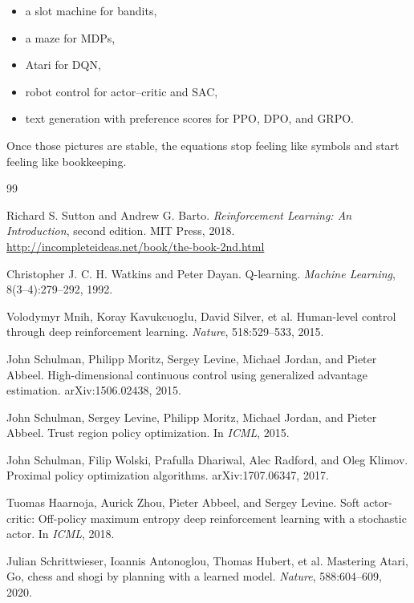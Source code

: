 \documentclass[11pt]{article}
\begin{document}
  \begin{itemize}
    \item a slot machine for bandits,
    \item a maze for MDPs,
    \item Atari for DQN,
    \item robot control for actor--critic and SAC,
    \item text generation with preference scores for PPO, DPO, and GRPO.
  \end{itemize}

  Once those pictures are stable, the equations stop feeling like symbols and start feeling like bookkeeping.

  \begin{thebibliography}{99}

  Richard S. Sutton and Andrew G. Barto.
  \newblock \emph{Reinforcement Learning: An Introduction}, second edition.
  \newblock MIT Press, 2018.
  \newblock \url{http://incompleteideas.net/book/the-book-2nd.html}

  Christopher J. C. H. Watkins and Peter Dayan.
  \newblock Q-learning.
  \newblock \emph{Machine Learning}, 8(3--4):279--292, 1992.

  Volodymyr Mnih, Koray Kavukcuoglu, David Silver, et al.
  \newblock Human-level control through deep reinforcement learning.
  \newblock \emph{Nature}, 518:529--533, 2015.

  John Schulman, Philipp Moritz, Sergey Levine, Michael Jordan, and Pieter Abbeel.
  \newblock High-dimensional continuous control using generalized advantage estimation.
  \newblock arXiv:1506.02438, 2015.

  John Schulman, Sergey Levine, Philipp Moritz, Michael Jordan, and Pieter Abbeel.
  \newblock Trust region policy optimization.
  \newblock In \emph{ICML}, 2015.

  John Schulman, Filip Wolski, Prafulla Dhariwal, Alec Radford, and Oleg Klimov.
  \newblock Proximal policy optimization algorithms.
  \newblock arXiv:1707.06347, 2017.

  Tuomas Haarnoja, Aurick Zhou, Pieter Abbeel, and Sergey Levine.
  \newblock Soft actor-critic: Off-policy maximum entropy deep reinforcement learning with a stochastic actor.
  \newblock In \emph{ICML}, 2018.

  Julian Schrittwieser, Ioannis Antonoglou, Thomas Hubert, et al.
  \newblock Mastering Atari, Go, chess and shogi by planning with a learned model.
  \newblock \emph{Nature}, 588:604--609, 2020.


\end{thebibliography}
\end{document}
